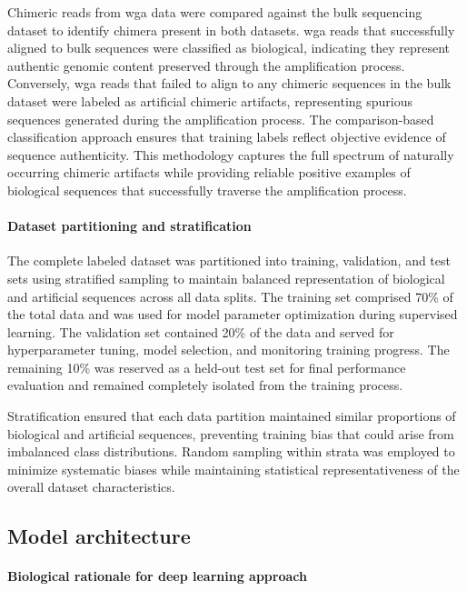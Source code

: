 \documentclass[pdflatex,sn-nature]{sn-jnl}%
\theoremstyle{thmstyleone}%
\theoremstyle{thmstyletwo}%
\theoremstyle{thmstylethree}%
\begin{document}
Chimeric reads from \gls{wga} data were compared against the bulk sequencing dataset to identify chimera present in both datasets.
\gls{wga} reads that successfully aligned to bulk sequences were classified as biological, indicating they represent authentic genomic content preserved through the amplification process.
Conversely, \gls{wga} reads that failed to align to any chimeric sequences in the bulk dataset were labeled as artificial chimeric artifacts, representing spurious sequences generated during the amplification process.
The comparison-based classification approach ensures that training labels reflect objective evidence of sequence authenticity.
This methodology captures the full spectrum of naturally occurring chimeric artifacts while providing reliable positive examples of biological sequences that successfully traverse the amplification process.

\paragraph{Dataset partitioning and stratification}
The complete labeled dataset was partitioned into training, validation, and test sets using stratified sampling to maintain balanced representation of biological and artificial sequences across all data splits.
The training set comprised 70\% of the total data and was used for model parameter optimization during supervised learning.
The validation set contained 20\% of the data and served for hyperparameter tuning, model selection, and monitoring training progress.
The remaining 10\% was reserved as a held-out test set for final performance evaluation and remained completely isolated from the training process.

Stratification ensured that each data partition maintained similar proportions of biological and artificial sequences, preventing training bias that could arise from imbalanced class distributions. Random sampling within strata was employed to minimize systematic biases while maintaining statistical representativeness of the overall dataset characteristics.

\subsection*{Model architecture}

\paragraph{Biological rationale for deep learning approach}
\end{document}
